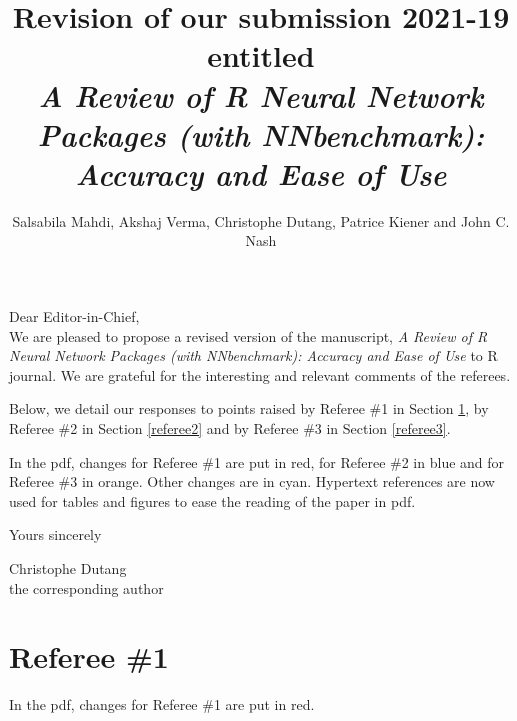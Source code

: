 \documentclass[12pt]{article}
\title{Revision of our submission 2021-19 entitled\\ \textsl{A Review of R Neural Network Packages (with NNbenchmark): Accuracy and Ease of Use}}
\author{Salsabila Mahdi, Akshaj Verma, Christophe Dutang, Patrice Kiener and John C. Nash}
\newcommand{\orange}[1]{{\color{orange}#1}}
\newcommand{\cyan}[1]{{\color{cyan}#1}}
\newcommand{\red}[1]{{\color{red}#1}}
\newcommand{\blue}[1]{{\color{blue}#1}}
\begin{document}
\maketitle

Dear Editor-in-Chief,\\

\noindent We are pleased to propose a revised version of the manuscript, 
\textsl{A Review of R Neural Network Packages (with NNbenchmark): Accuracy and Ease of Use} to R journal. 
We are grateful for the interesting and relevant comments of the referees.

\medskip
Below, we detail our responses to points raised by Referee \#1 in Section \ref{referee1},
by Referee \#2 in Section \ref{referee2} and by Referee \#3 in Section \ref{referee3}.
\medskip

In the pdf, changes for Referee  \#1 are put in \red{red}, for Referee \#2 in \blue{blue} and
for Referee  \#3 in \orange{orange}.  Other changes are in \cyan{cyan}.
Hypertext references are now used for tables and figures to ease the reading of the paper in pdf.
\bigskip

Yours sincerely
\bigskip


Christophe Dutang\\
the corresponding author

 
\newpage
\section{Referee \#1}\label{referee1}

In the pdf, changes for Referee  \#1 are put in \red{red}.  
\end{document}
